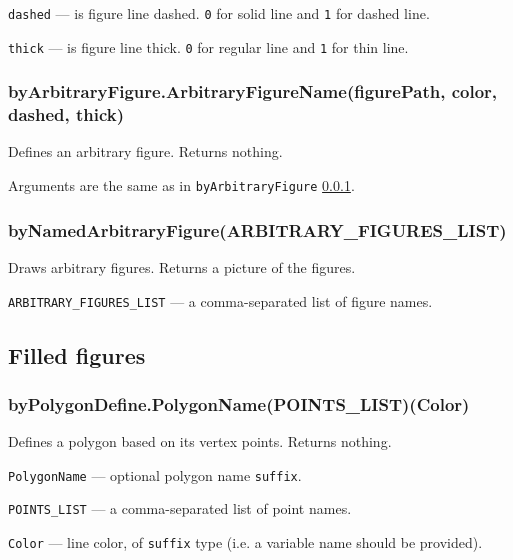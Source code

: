 \documentclass{ltxdoc}
\begin{document}
	\texttt{dashed} — is figure line dashed. \texttt{0} for solid line and \texttt{1} for dashed line.
	
	\texttt{thick} — is figure line thick. \texttt{0} for regular line and \texttt{1} for thin line.

\subsubsection{byArbitraryFigure.ArbitraryFigureName(figurePath, color, dashed, thick)}\label{byArbitraryFigure}

	Defines an arbitrary figure. Returns nothing.
	
	Arguments are the same as in \texttt{byArbitraryFigure} \ref{byArbitraryFigure}.

\subsubsection{byNamedArbitraryFigure(ARBITRARY\_FIGURES\_LIST)}\label{byNamedArbitraryFigure}

	Draws arbitrary figures. Returns a picture of the figures.
	
	\texttt{ARBITRARY\_FIGURES\_LIST} — a comma-separated list of figure names.


\subsection{Filled figures}


\subsubsection{byPolygonDefine.PolygonName(POINTS\_LIST)(Color)}\label{byPolygonDefine}

	Defines a polygon based on its vertex points. Returns nothing.
	
	\texttt{PolygonName} — optional polygon name \texttt{suffix}.
	
	\texttt{POINTS\_LIST} — a comma-separated list of point names.
	
	\texttt{Color} — line color, of \texttt{suffix} type (i.e. a variable name should be provided).

\end{document}
